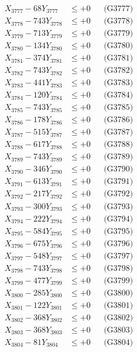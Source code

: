 \documentclass[a4paper,10pt]{article}
\begin{document}
{\begin{align}
X_{3777} - 68Y_{3777} &\leq +0 && \text{(G3777)} \\
X_{3778} - 743Y_{3778} &\leq +0 && \text{(G3778)} \\
X_{3779} - 713Y_{3779} &\leq +0 && \text{(G3779)} \\
X_{3780} - 134Y_{3780} &\leq +0 && \text{(G3780)} \\
\allowbreak
X_{3781} - 374Y_{3781} &\leq +0 && \text{(G3781)} \\
X_{3782} - 743Y_{3782} &\leq +0 && \text{(G3782)} \\
X_{3783} - 441Y_{3783} &\leq +0 && \text{(G3783)} \\
X_{3784} - 120Y_{3784} &\leq +0 && \text{(G3784)} \\
X_{3785} - 743Y_{3785} &\leq +0 && \text{(G3785)} \\
X_{3786} - 178Y_{3786} &\leq +0 && \text{(G3786)} \\
X_{3787} - 515Y_{3787} &\leq +0 && \text{(G3787)} \\
X_{3788} - 617Y_{3788} &\leq +0 && \text{(G3788)} \\
X_{3789} - 743Y_{3789} &\leq +0 && \text{(G3789)} \\
X_{3790} - 346Y_{3790} &\leq +0 && \text{(G3790)} \\
\allowbreak
X_{3791} - 613Y_{3791} &\leq +0 && \text{(G3791)} \\
X_{3792} - 217Y_{3792} &\leq +0 && \text{(G3792)} \\
X_{3793} - 300Y_{3793} &\leq +0 && \text{(G3793)} \\
X_{3794} - 222Y_{3794} &\leq +0 && \text{(G3794)} \\
X_{3795} - 584Y_{3795} &\leq +0 && \text{(G3795)} \\
X_{3796} - 675Y_{3796} &\leq +0 && \text{(G3796)} \\
X_{3797} - 548Y_{3797} &\leq +0 && \text{(G3797)} \\
X_{3798} - 743Y_{3798} &\leq +0 && \text{(G3798)} \\
X_{3799} - 477Y_{3799} &\leq +0 && \text{(G3799)} \\
X_{3800} - 285Y_{3800} &\leq +0 && \text{(G3800)} \\
\allowbreak
X_{3801} - 122Y_{3801} &\leq +0 && \text{(G3801)} \\
X_{3802} - 368Y_{3802} &\leq +0 && \text{(G3802)} \\
X_{3803} - 368Y_{3803} &\leq +0 && \text{(G3803)} \\
X_{3804} - 81Y_{3804} &\leq +0 && \text{(G3804)} \\

\end{align}}
\end{document}
